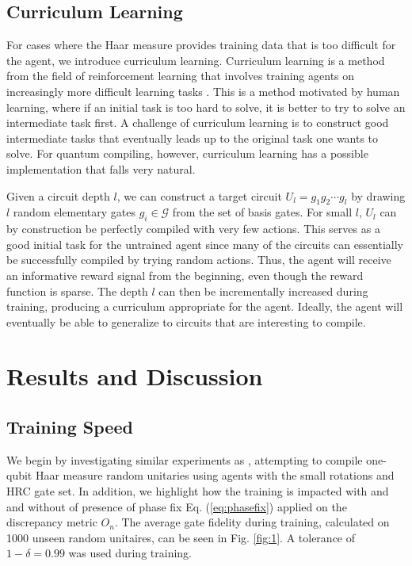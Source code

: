 \documentclass[%
 aip,
 floatfix,
 amsmath,amssymb,
 reprint,%
]{revtex4-1}
\begin{document}
\subsection{Curriculum Learning}\label{sec:CurriculumLearning}
For cases where the Haar measure provides training data that is too difficult for the agent, we introduce curriculum learning. Curriculum learning is a method from the field of reinforcement learning that involves training agents on increasingly more difficult learning tasks \cite{Curriculum}. This is a method motivated by human learning, where if an initial task is too hard to solve, it is better to try to solve an intermediate task first. 
A challenge of curriculum learning is to construct good intermediate tasks that eventually leads up to the original task one wants to solve. For quantum compiling, however, curriculum learning has a possible implementation that falls very natural. 

Given a circuit depth $l$, we can construct a target circuit $U_l = g_1g_2 \cdots g_l$ by drawing $l$ random elementary gates $g_i \in \mathcal{G}$ from the set of basis gates. For small $l$, $U_l$ can by construction be perfectly compiled with very few actions. This serves as a good initial task for the untrained agent since many of the circuits can essentially be successfully compiled by trying random actions. Thus, the agent will receive an informative reward signal from the beginning, even though the reward function is sparse. The depth $l$ can then be incrementally increased during training, producing a curriculum appropriate for the agent. Ideally, the agent will eventually be able to generalize to circuits that are interesting to compile.



\section{Results and Discussion\label{sec:4}}

\subsection{Training Speed}

We begin by investigating similar experiments as \citet{QCRL}, attempting to compile one-qubit Haar measure random unitaries using agents with the small rotations and HRC gate set. In addition, we highlight how the training is impacted with and and without of presence of phase fix Eq. (\ref{eq:phasefix}) applied on the discrepancy metric $O_n$. The average gate fidelity during training, calculated on 1000 unseen random unitaires, can be seen in Fig. \ref{fig:1}. A tolerance of $1 - \delta = 0.99$ was used during training.
\end{document}
